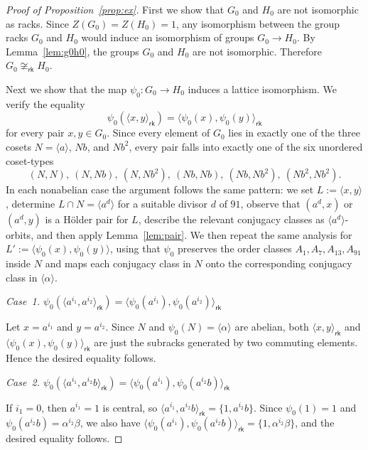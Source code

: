 \documentclass[a4paper,12pt]{article}
\theoremstyle{definition}
\theoremstyle{remark}
\begin{document}
\begin{proof}[Proof of Proposition~\ref{prop:ex}]
  First we show that $G_0$ and $H_0$ are not isomorphic as racks. Since $Z(G_0)=Z(H_0)=1$, any isomorphism between the group racks $G_0$ and $H_0$ would induce an isomorphism of groups $G_0\to H_0$. By Lemma~\ref{lem:g0h0}, the groups $G_0$ and $H_0$ are not isomorphic. Therefore $G_0\not\cong_{\mathsf{rk}} H_0$.

  Next we show that the map $\psi_0\colon G_0\to H_0$ induces a lattice isomorphism. We verify the equality
  $$ \psi_0(\langle x,y\rangle_{\mathsf{rk}}) = \langle \psi_0(x),\psi_0(y)\rangle_{\mathsf{rk}} $$
  for every pair $x,y\in G_0$. Since every element of $G_0$ lies in exactly one of the three cosets $N=\langle a\rangle$, $Nb$, and $Nb^2$, every pair falls into exactly one of the six unordered coset-types
  $$ (N,N),\ (N,Nb),\ (N,Nb^2),\ (Nb,Nb),\ (Nb,Nb^2),\ (Nb^2,Nb^2). $$
  In each nonabelian case the argument follows the same pattern: we set $L:=\langle x,y\rangle$, determine $L\cap N=\langle a^d\rangle$ for a suitable divisor $d$ of $91$, observe that $(a^d,x)$ or $(a^d,y)$ is a Hölder pair for $L$, describe the relevant conjugacy classes as $\langle a^d\rangle$-orbits, and then apply Lemma~\ref{lem:pair}. We then repeat the same analysis for $L':=\langle \psi_0(x),\psi_0(y)\rangle$, using that $\psi_0$ preserves the order classes $A_1,A_7,A_{13},A_{91}$ inside $N$ and maps each conjugacy class in $N$ onto the corresponding conjugacy class in $\langle \alpha\rangle$.

  \medskip
  \noindent
  \emph{Case~1.\; $\psi_0(\langle a^{i_1},a^{i_2}\rangle_{\mathsf{rk}}) = \langle \psi_0(a^{i_1}),\psi_0(a^{i_2})\rangle_{\mathsf{rk}}$}

  \medskip
  Let $x=a^{i_1}$ and $y=a^{i_2}$. Since $N$ and $\psi_0(N)=\langle\alpha\rangle$ are abelian, both $\langle x,y\rangle_{\mathsf{rk}}$ and $\langle \psi_0(x),\psi_0(y)\rangle_{\mathsf{rk}}$ are just the subracks generated by two commuting elements. Hence the desired equality follows.
  
  
  \medskip
  \noindent
  \emph{Case~2.\; $\psi_0(\langle a^{i_1},a^{i_2}b\rangle_{\mathsf{rk}})=\langle \psi_0(a^{i_1}),\psi_0(a^{i_2}b)\rangle_{\mathsf{rk}}$}
  
  \medskip
  If $i_1=0$, then $a^{i_1}=1$ is central, so $\langle a^{i_1},a^{i_2}b\rangle_{\mathsf{rk}}=\{1,a^{i_2}b\}$. Since $\psi_0(1)=1$ and $\psi_0(a^{i_2}b)=\alpha^{i_2}\beta$, we also have $\langle \psi_0(a^{i_1}),\psi_0(a^{i_2}b)\rangle_{\mathsf{rk}}=\{1,\alpha^{i_2}\beta\}$, and the desired equality follows.
  

\end{proof}
\end{document}
